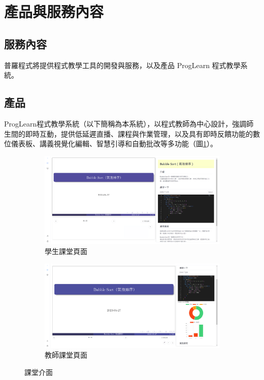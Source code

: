 \section{產品與服務內容}

\subsection{服務內容}

普羅程式將提供程式教學工具的開發與服務，以及產品 ProgLearn 程式教學系統。

\subsection{產品}

ProgLearn程式教學系統（以下簡稱為本系統），以程式教師為中心設計，強調師生間的即時互動，提供低延遲直播、課程與作業管理，以及具有即時反饋功能的數位儀表板、講義視覺化編輯、智慧引導和自動批改等多功能（圖\ref{fig:Classroom}）。

\begin{figure}[H]
  \begin{subfigure}{0.5\linewidth}
    \centering
    \includegraphics[width=1\textwidth]{images/student.png}
    \caption{學生課堂頁面}
  \end{subfigure}
  \begin{subfigure}{0.5\linewidth}
    \centering
    \includegraphics[width=1\textwidth]{images/teacher.png}
    \caption{教師課堂頁面}
  \end{subfigure}
  \caption{課堂介面}
  \label{fig:Classroom}
\end{figure}

